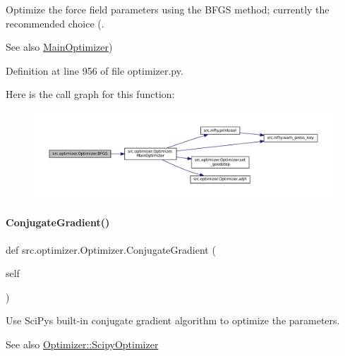 Optimize the force field parameters using the B\+F\+GS method; currently the recommended choice (. 

\begin{DoxySeeAlso}{See also}
\hyperlink{classsrc_1_1optimizer_1_1Optimizer_a30443d919712b0f3529de3c7d62619ca}{Main\+Optimizer}) 
\end{DoxySeeAlso}


Definition at line 956 of file optimizer.\+py.

Here is the call graph for this function\+:
\nopagebreak
\begin{figure}[H]
\begin{center}
\leavevmode
\includegraphics[width=350pt]{classsrc_1_1optimizer_1_1Optimizer_a8cdd2f557dca05f63ffd1893916fd4ca_cgraph}
\end{center}
\end{figure}
\mbox{\label{classsrc_1_1optimizer_1_1Optimizer_a6b8bc81ae670b40040d07ae09ccdb7a2}} 
\paragraph{\texorpdfstring{Conjugate\+Gradient()}{ConjugateGradient()}}
{\footnotesize\ttfamily def src.\+optimizer.\+Optimizer.\+Conjugate\+Gradient (\begin{DoxyParamCaption}\item[{}]{self }\end{DoxyParamCaption})}



Use Sci\+Py\textquotesingle{}s built-\/in conjugate gradient algorithm to optimize the parameters. 

\begin{DoxySeeAlso}{See also}
\hyperlink{classsrc_1_1optimizer_1_1Optimizer_a1e616a4c920b3e8935ca19e208b1c3be}{Optimizer\+::\+Scipy\+Optimizer} 
\end{DoxySeeAlso}


